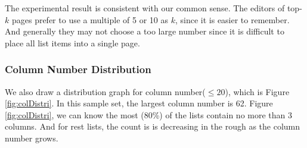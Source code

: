 The experimental result is consistent with our common sense.
The editors of top-$k$ pages prefer to use a multiple of 5 or 10 as $k$,
since it is easier to remember.
And generally they may not choose a too large number
since it is difficult to place all list items into a single page.


\subsubsection{Column Number Distribution}
We also draw a distribution graph for column number($\leq20$), which is Figure \ref{fig:colDistri}.
In this sample set, the largest column number is 62.
Figure \ref{fig:colDistri}, we can know the most (80\%) of the lists contain no more than 3 columns.
And for rest lists, the count is is decreasing in the rough as the column number grows.


